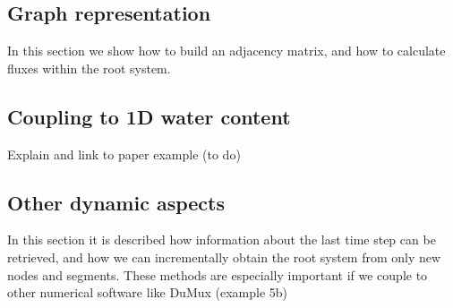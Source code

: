 \documentclass[a4paper]{article}
\begin{document}
\subsection{Graph representation}

In this section we show how to build an adjacency matrix, and how to calculate fluxes within the root system.



\subsection{Coupling to 1D water content}

Explain and link to paper example (to do)

\subsection{Other dynamic aspects}

In this section it is described how information about the last time step can be retrieved, 
and how we can incrementally obtain the root system from only new nodes and segments. 
These methods are especially important if we couple to other numerical software like DuMux (example 5b)





\end{document}
